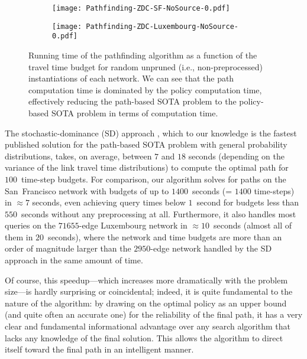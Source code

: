 \documentclass[oribibl]{llncs}
\begin{document}
			\begin{figure}[h]
				\centering
				\begin{subfigure}{0.48\textwidth}
					\centering
					\texttt{[image: Pathfinding-ZDC-SF-NoSource-0.pdf]}
				\end{subfigure}
				\begin{subfigure}{0.448\textwidth}
					\centering
					\texttt{[image: Pathfinding-ZDC-Luxembourg-NoSource-0.pdf]}
				\end{subfigure}
				\caption
				{
					Running time of the pathfinding algorithm as a function of the travel time
					budget for random unpruned
					(i.e., non-preprocessed) instantiations of each network.
					We can see that the path computation time is dominated
					by the policy computation time, effectively
					reducing the path-based SOTA problem to the policy-based SOTA problem
					in terms of computation time.
				}
				\label{fig:Pathfinding-ZDC}
			\end{figure}

			The stochastic-dominance (SD) approach \cite*{nie2009shortest},
			which to our knowledge is the fastest published solution
			for the path-based SOTA problem with general probability distributions,
			takes, on average, between $7$ and $18$ seconds
			(depending on the variance of the link travel time distributions)
			to compute the optimal path for $100$~time-step budgets.
			For comparison, our algorithm solves for paths on the San~Francisco network with
			budgets of up to $1400$~seconds (= $1400$ time-steps) in $\approx 7$ seconds, even
			achieving query times below $1$~second for budgets less than $550$~seconds
			without any preprocessing at all.
			Furthermore, it also handles most queries on the $71655$-edge Luxembourg
			network in $\approx 10$~seconds (almost all of them in $20$~seconds),
			where the network and time budgets are more than an order of magnitude larger than the
			$2950$-edge network handled by the SD approach in the same amount of time.

			Of course, this speedup---which increases more dramatically with the problem size---is
			hardly surprising or coincidental; indeed, it is quite fundamental to the nature of the algorithm:
			by drawing on the optimal policy as an upper bound (and quite often an accurate one) for the reliability
			of the final path, it has a very clear and fundamental informational advantage over any search algorithm
			that lacks any knowledge of the final solution.
			This allows the algorithm to direct itself toward the final path in an intelligent manner.
\end{document}
